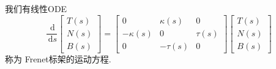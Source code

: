 \documentclass[../../古典微分几何.tex]{subfiles}
\begin{document}
\begin{proposition}
    我们有线性ODE \[
    \frac{\,\mathrm{d}  }{\,\mathrm{d} s } \begin{bmatrix} 
        T\left( s \right)\\ 
         N\left( s \right)\\ 
          B\left( s \right)    
    \end{bmatrix} =  \begin{bmatrix} 
        0 &  \kappa  \left( s \right)&0 \\ 
         - \kappa  \left( s \right)&0&\tau \left( s \right)\\ 
          0&-\tau \left( s \right)&0   

    \end{bmatrix} \begin{bmatrix} 
        T\left( s \right)  \\ 
         N\left( s \right)\\ 
          B\left( s \right)  
    \end{bmatrix}    
    \]称为 Frenet标架的运动方程.
\end{proposition}
\end{document}
